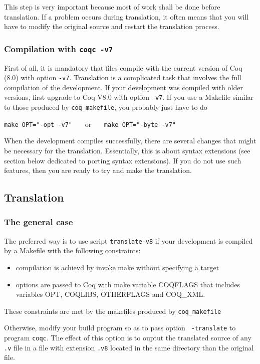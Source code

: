 \documentclass[11pt,a4paper]{article}
\begin{document}
This step is very important because most of work shall be done before
translation. If a problem occurs during translation, it often means
that you will have to modify the original source and restart the
translation process.

\subsubsection{Compilation with {\tt coqc -v7}}

First of all, it is mandatory that files compile with the current
version of Coq (8.0) with option {\tt -v7}. Translation is a
complicated task that involves the full compilation of the
development. If your development was compiled with older versions,
first upgrade to Coq V8.0 with option {\tt -v7}. If you use a Makefile
similar to those produced by {\tt coq\_makefile}, you probably just
have to do

{\tt make OPT="-opt -v7"} ~~~or~~~ {\tt make OPT="-byte -v7"}

When the development compiles successfully, there are several changes
that might be necessary for the translation. Essentially, this is
about syntax extensions (see section below dedicated to porting syntax
extensions). If you do not use such features, then you are ready to
try and make the translation.

\subsection{Translation}

\subsubsection{The general case}

The preferred way is to use script {\tt translate-v8} if your development
is compiled by a Makefile with the following constraints:
\begin{itemize}
\item compilation is achievd by invoke make without specifying a target
\item options are passed to Coq with make variable COQFLAGS that
  includes variables OPT, COQLIBS, OTHERFLAGS and COQ_XML.
\end{itemize}
These constraints are met by the makefiles produced by {\tt coq\_makefile}

Otherwise, modify your build program so as to pass option {\tt
-translate} to program {\tt coqc}. The effect of this option is to
ouptut the translated source of any {\tt .v} file in a file with
extension {\tt .v8} located in the same directory than the original
file.
\end{document}
